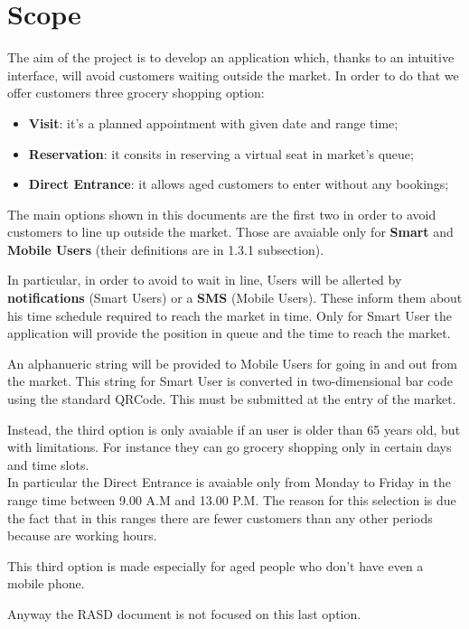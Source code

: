  
\section{Scope}

The aim of the project is to develop an application which, thanks to an intuitive interface, will avoid customers waiting outside the market.
In order to do that we offer customers three grocery shopping option: 

\begin{itemize}
\item \textbf{Visit}: it's a planned appointment with given date and range time;
\item \textbf{Reservation}: it consits in reserving a virtual seat in market's queue;
\item \textbf{Direct Entrance}: it allows aged customers to enter without any bookings;
\end{itemize}
\bigskip
The main options shown in this documents are the first two in order to avoid customers to line up outside the market. Those are avaiable only for \textbf{Smart} and \textbf{Mobile Users} (their definitions are in 1.3.1 subsection).\par
In particular, in order to avoid to wait in line, Users will be allerted by \textbf{notifications} (Smart Users) or a \textbf{SMS} (Mobile Users). These inform them about his time schedule required to reach the market in time.
Only for Smart User the application will provide the position in queue and the time to reach the market.\par
An alphanueric string will be provided to Mobile Users for going in and out from the market. This string for Smart User is converted in two-dimensional bar code using the standard QRCode. This must be submitted at the entry of the market.\par
Instead, the third option is only avaiable if an user is older than 65 years old, but with limitations. For instance they can go grocery shopping only in certain days and time slots. \\
In particular the Direct Entrance is avaiable only from Monday to Friday in the range time between 9.00 A.M and 13.00 P.M. The reason for this selection is due the fact that in this ranges there are fewer customers than any other periods because are working hours. \par
This third option is made especially for aged people who don't have even a mobile phone. \par
Anyway the RASD document is not focused on this last option.


